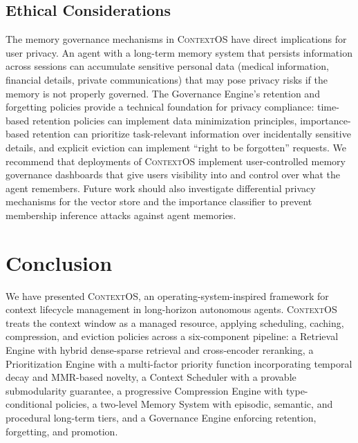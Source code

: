\documentclass[review,12pt]{elsarticle}
\newcommand{\contextos}{\textsc{ContextOS}}
\begin{document}
\subsection{Ethical Considerations}
\label{subsec:ethics}

The memory governance mechanisms in \contextos{} have direct implications
for user privacy.  An agent with a long-term memory system that persists
information across sessions can accumulate sensitive personal data (medical
information, financial details, private communications) that may pose privacy
risks if the memory is not properly governed.  The Governance Engine's
retention and forgetting policies provide a technical foundation for privacy
compliance: time-based retention policies can implement data minimization
principles, importance-based retention can prioritize task-relevant information
over incidentally sensitive details, and explicit eviction can implement
``right to be forgotten'' requests.  We recommend that deployments of \contextos{}
implement user-controlled memory governance dashboards that give users visibility
into and control over what the agent remembers.  Future work should also
investigate differential privacy mechanisms for the vector store and the
importance classifier to prevent membership inference attacks against agent
memories.

\section{Conclusion}
\label{sec:conclusion}

We have presented \contextos{}, an operating-system-inspired framework for
context lifecycle management in long-horizon autonomous agents.  \contextos{}
treats the context window as a managed resource, applying scheduling,
caching, compression, and eviction policies across a six-component pipeline:
a Retrieval Engine with hybrid dense-sparse retrieval and cross-encoder
reranking, a Prioritization Engine with a multi-factor priority function
incorporating temporal decay and MMR-based novelty, a Context Scheduler with
a provable submodularity guarantee, a progressive Compression Engine with
type-conditional policies, a two-level Memory System with episodic, semantic,
and procedural long-term tiers, and a Governance Engine enforcing retention,
forgetting, and promotion.
\end{document}
